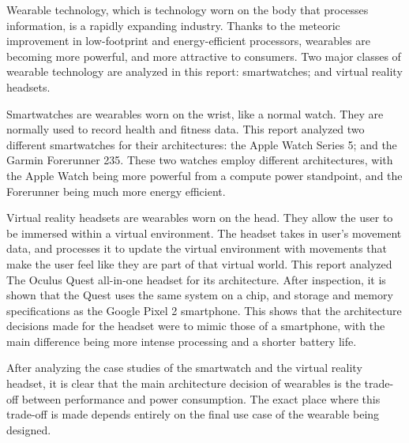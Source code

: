 Wearable technology, which is technology worn on the body that processes information,
is a rapidly expanding industry. Thanks to the meteoric improvement in
low-footprint and energy-efficient processors, wearables are becoming more powerful,
and more attractive to consumers. Two major classes of wearable technology are analyzed
in this report: smartwatches; and virtual reality headsets.

Smartwatches are wearables worn on the wrist, like a normal watch. They are normally
used to record health and fitness data. This report analyzed two different smartwatches
for their architectures: the Apple Watch Series 5; and the Garmin Forerunner 235.
These two watches employ different architectures, with the Apple Watch being more
powerful from a compute power standpoint, and the Forerunner being much more energy
efficient.

Virtual reality headsets are wearables worn on the head. They allow the user to be immersed within a
virtual environment.
The headset takes in user's movement data, and processes it to update the virtual
environment with movements that make the user feel like they are part of that virtual
world. This report analyzed The Oculus Quest all-in-one headset for its architecture. After
inspection, it is shown that the Quest uses the same system on a chip, and storage
and memory specifications as the Google Pixel 2 smartphone. This shows that the
architecture decisions made for the headset were to mimic those of a smartphone, with
the main difference being more intense processing and a shorter battery life.

After analyzing the case studies of the smartwatch and the virtual reality headset,
it is clear that the main architecture decision of wearables is the trade-off between
performance and power consumption. The exact place where this trade-off is made depends
entirely on the final use case of the wearable being designed.